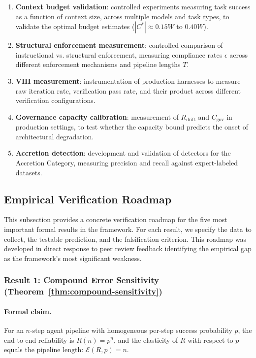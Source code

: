 \documentclass[11pt, a4paper, logo, copyright]{googledeepmind}
\begin{document}
\begin{enumerate}
    \item \textbf{Context budget validation}: controlled experiments measuring task success as a function of context size, across multiple models and task types, to validate the optimal budget estimates ($|C^*| \approx 0.15W$ to $0.40W$).
    \item \textbf{Structural enforcement measurement}: controlled comparison of instructional vs. structural enforcement, measuring compliance rates $\epsilon$ across different enforcement mechanisms and pipeline lengths $T$.
    \item \textbf{VIH measurement}: instrumentation of production harnesses to measure raw iteration rate, verification pass rate, and their product across different verification configurations.
    \item \textbf{Governance capacity calibration}: measurement of $R_{\text{drift}}$ and $C_{\text{gov}}$ in production settings, to test whether the capacity bound predicts the onset of architectural degradation.
    \item \textbf{Accretion detection}: development and validation of detectors for the Accretion Category, measuring precision and recall against expert-labeled datasets.
\end{enumerate}

\subsection{Empirical Verification Roadmap}
\label{sec:verification-roadmap}

This subsection provides a concrete verification roadmap for the five most important formal results in the framework. For each result, we specify the data to collect, the testable prediction, and the falsification criterion. This roadmap was developed in direct response to peer review feedback identifying the empirical gap as the framework's most significant weakness.

\subsubsection{Result 1: Compound Error Sensitivity (Theorem~\ref{thm:compound-sensitivity})}

\paragraph{Formal claim.} For an $n$-step agent pipeline with homogeneous per-step success probability $p$, the end-to-end reliability is $R(n) = p^n$, and the elasticity of $R$ with respect to $p$ equals the pipeline length: $\mathcal{E}(R,p) = n$.
\end{document}
